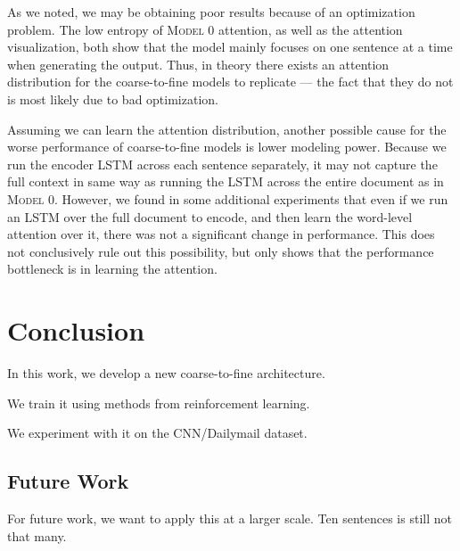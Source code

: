 \documentclass[12pt]{report}
\begin{document}
As we noted, we may be obtaining poor results because of an optimization problem. The low entropy of \textsc{Model 0} attention, as well as the attention visualization, both show that the model mainly focuses on one sentence at a time when generating the output. Thus, in theory there exists an attention distribution for the coarse-to-fine models to replicate --- the fact that they do not is most likely due to bad optimization.

Assuming we can learn the attention distribution, another possible cause for the worse performance of coarse-to-fine models is lower modeling power. Because we run the encoder LSTM across each sentence separately, it may not capture the full context in same way as running the LSTM across the entire document as in \textsc{Model 0}.
However, we found in some additional experiments that even if we run an LSTM over the full document to encode, and then learn the word-level attention over it, there was not a significant change in performance. This does not conclusively rule out this possibility, but only shows that the performance bottleneck is in learning the attention.



\chapter{Conclusion}
\label{chap:conclusion}

In this work, we develop a new coarse-to-fine architecture.

We train it using methods from reinforcement learning.

We experiment with it on the CNN/Dailymail dataset.

\section{Future Work}

For future work, we want to apply this at a larger scale. Ten sentences is still not that many.




\end{document}
